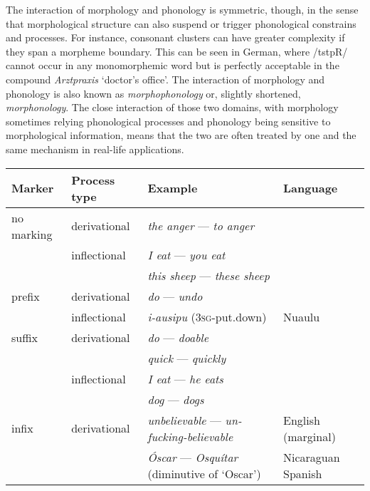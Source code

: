 The interaction of morphology and phonology is symmetric, though, in the sense that morphological structure can also suspend or trigger phonological constrains and processes.
For instance, consonant clusters can have greater complexity if they span a morpheme boundary.
This can be seen in German, where /tstpR/ cannot occur in any monomorphemic word but is perfectly acceptable in the compound \emph{Arztpraxis} `doctor's office'.
The interaction of morphology and phonology is also known as \emph{morphophonology} or, slightly shortened, \emph{morphonology}.
The close interaction of those two domains, with morphology sometimes relying phonological processes and phonology being sensitive to morphological information, means that the two are often treated by one and the same mechanism in real-life applications.
%
\begin{table}
\centering
    \begin{tabular}{llll}
        \toprule
        \textbf{Marker} & \textbf{Process type} & \textbf{Example}                                                       & \textbf{Language}\\
        \midrule
        no marking      & derivational          & \emph{the anger} --- \emph{to anger} & \\
                        & inflectional          & \emph{I eat} --- \emph{you eat} & \\
                        &                       & \emph{this sheep} --- \emph{these sheep} & \\
        \midrule
        prefix          & derivational          & \emph{do} --- \emph{undo} & \\
                        & inflectional          & \emph{i-ausipu} (\textsc{3sg}-put.down)                                & Nuaulu\\
        \midrule
        suffix          & derivational          & \emph{do} --- \emph{doable} & \\
                        &                       & \emph{quick} --- \emph{quickly} & \\
                        & inflectional          & \emph{I eat} --- \emph{he eats} & \\
                        &                       & \emph{dog} --- \emph{dogs} & \\
        \midrule
        infix           & derivational          & \emph{unbelievable} --- \emph{un-fucking-believable} & English (marginal)\\
                        &                       & \emph{Óscar} --- \emph{Osquítar} (diminutive of `Oscar')               & Nicaraguan Spanish\\

\end{tabular}
\end{table}
